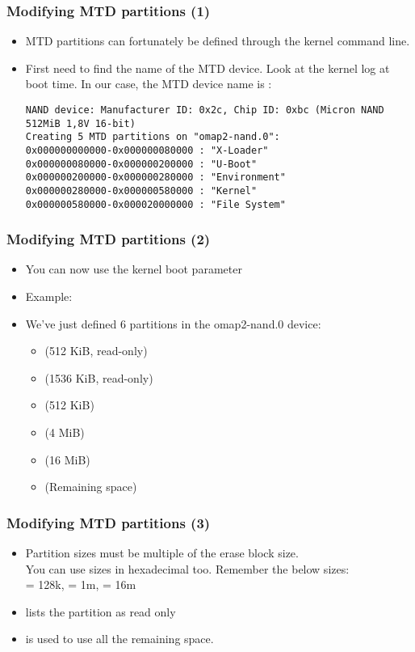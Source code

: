 \begin{frame}[fragile]
  \frametitle{Modifying MTD partitions (1)}
  \begin{itemize}
  \item MTD partitions can fortunately be defined through the kernel
    command line.
  \item First need to find the name of the MTD device. Look at the
    kernel log at boot time. In our case, the MTD device name is
    :
\small
\begin{verbatim}
NAND device: Manufacturer ID: 0x2c, Chip ID: 0xbc (Micron NAND 512MiB 1,8V 16-bit)
Creating 5 MTD partitions on "omap2-nand.0":
0x000000000000-0x000000080000 : "X-Loader"
0x000000080000-0x000000200000 : "U-Boot"
0x000000200000-0x000000280000 : "Environment"
0x000000280000-0x000000580000 : "Kernel"
0x000000580000-0x000020000000 : "File System"
\end{verbatim}
  \end{itemize}
\end{frame}

\begin{frame}
  \frametitle{Modifying MTD partitions (2)}
  \begin{itemize}
  \item You can now use the  kernel boot parameter
  \item Example:\\
  \item We've just defined 6 partitions in the omap2-nand.0 device:
    \begin{itemize}
    \item {} (512 KiB, read-only)
    \item {} (1536 KiB, read-only)
    \item {} (512 KiB)
    \item {} (4 MiB)
    \item {} (16 MiB)
    \item {} (Remaining space)
    \end{itemize}
  \end{itemize}
\end{frame}

\begin{frame}
  \frametitle{Modifying MTD partitions (3)}
  \begin{itemize}
  \item Partition sizes must be multiple of the erase block size.\\
    You can use sizes in hexadecimal too. Remember the below sizes:\\
     = 128k,  = 1m,  = 16m
  \item {} lists the partition as read only
  \item \code{-} is used to use all the remaining space.
  \end{itemize}
\end{frame}

